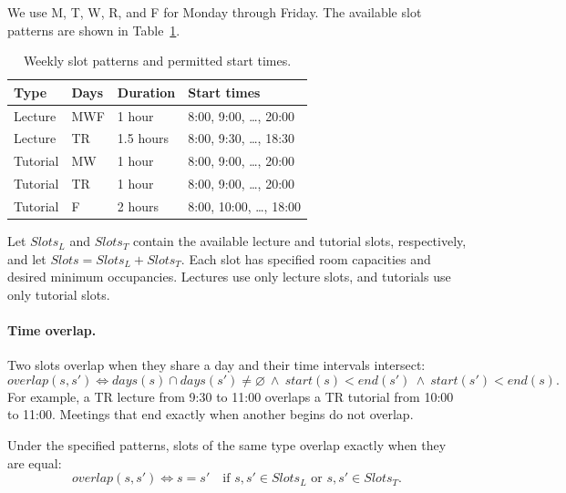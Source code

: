 We use M, T, W, R, and F for Monday through Friday.
The available slot patterns are shown in
Table~\ref{tab:slots}.

\begin{table}[ht]
\centering
\small
\caption{Weekly slot patterns and permitted start times.}
\label{tab:slots}
\begin{tabular}{@{}llll@{}}
\toprule
Type & Days & Duration & Start times\\
\midrule
Lecture & MWF & 1 hour
  & 8:00, 9:00, \ldots, 20:00\\
Lecture & TR & 1.5 hours
  & 8:00, 9:30, \ldots, 18:30\\
Tutorial & MW & 1 hour
  & 8:00, 9:00, \ldots, 20:00\\
Tutorial & TR & 1 hour
  & 8:00, 9:00, \ldots, 20:00\\
Tutorial & F & 2 hours
  & 8:00, 10:00, \ldots, 18:00\\
\bottomrule
\end{tabular}
\end{table}

Let $\mathit{Slots}_L$ and $\mathit{Slots}_T$ contain the
available lecture and tutorial slots, respectively, and let
$\mathit{Slots}=\mathit{Slots}_L+\mathit{Slots}_T$.
Each slot has specified room capacities and desired minimum
occupancies. Lectures use only lecture slots, and tutorials
use only tutorial slots.

\paragraph{Time overlap.}
Two slots overlap when they share a day and their time
intervals intersect:
\begin{equation}
\mathit{overlap}(s, s') \iff
\mathit{days}(s) \cap \mathit{days}(s') \neq \varnothing
\ \wedge\ \mathit{start}(s) < \mathit{end}(s')
\ \wedge\ \mathit{start}(s') < \mathit{end}(s).
\label{eq:overlap}
\end{equation}
For example, a TR lecture from 9:30 to 11:00 overlaps a
TR tutorial from 10:00 to 11:00. Meetings that end exactly
when another begins do not overlap.

Under the specified patterns, slots of the same type
overlap exactly when they are equal:
\begin{equation}
\mathit{overlap}(s,s')\iff s=s'
\quad
\text{if }s,s'\in\mathit{Slots}_L
\text{ or }s,s'\in\mathit{Slots}_T.
\label{eq:overlap-eq}
\end{equation}

